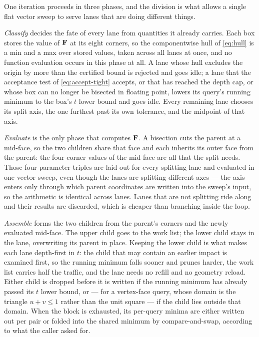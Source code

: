 One iteration proceeds in three phases, and the division is what allows a single
flat vector sweep to serve lanes that are doing different things.

\emph{Classify} decides the fate of every lane from quantities it already
carries. Each box stores the value of $\mathbf{F}$ at its eight corners, so the
componentwise hull of \cref{eq:hull} is a min and a max over stored values, taken
across all lanes at once, and no function evaluation occurs in this phase at all.
A lane whose hull excludes the origin by more than the certified bound is
rejected and goes idle; a lane that the acceptance test of
\cref{eq:accept-tight} accepts, or that has reached the depth cap, or whose box
can no longer be bisected in floating point, lowers its query's running minimum
to the box's $t$ lower bound and goes idle. Every remaining lane chooses its
split axis, the one furthest past its own tolerance, and the midpoint of that
axis.

\emph{Evaluate} is the only phase that computes $\mathbf{F}$. A bisection cuts the
parent at a mid-face, so the two children share that face and each inherits its
outer face from the parent: the four corner values of the mid-face are all that
the split needs. Those four parameter triples are laid out for every splitting
lane and evaluated in one vector sweep, even though the lanes are splitting
different axes --- the axis enters only through which parent coordinates are
written into the sweep's input, so the arithmetic is identical across lanes.
Lanes that are not splitting ride along and their results are discarded, which
is cheaper than branching inside the loop.

\emph{Assemble} forms the two children from the parent's corners and the newly
evaluated mid-face. The upper child goes to the work list; the lower child stays
in the lane, overwriting its parent in place. Keeping the lower child is what
makes each lane depth-first in $t$: the child that may contain an earlier impact
is examined first, so the running minimum falls sooner and prunes harder, the
work list carries half the traffic, and the lane needs no refill and no geometry
reload. Either child is dropped before it is written if the running minimum has
already passed its $t$ lower bound, or --- for a vertex-face query, whose domain
is the triangle $u+v\le1$ rather than the unit square --- if the child lies
outside that domain. When the block is exhausted, its per-query minima are either
written out per pair or folded into the shared minimum by compare-and-swap,
according to what the caller asked for.

